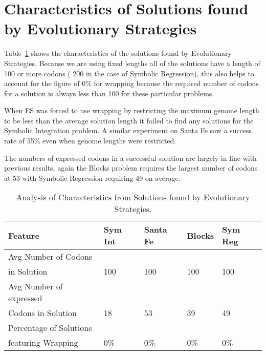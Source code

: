 \section{Characteristics of Solutions found by Evolutionary Strategies}
Table~\ref{es_results_analysis_table} shows the characteristics of the solutions found by Evolutionary Strategies. Because we are using fixed lengths all of the solutions have a length of 100 or more codons ( 200 in the case of Symbolic Regression), this also helps to account for the figure of 0\% for wrapping because the required number of codons for a solution is always less than 100 for these particular problems. 

When ES was forced to use wrapping by restricting the maximum genome length to be less than the average solution length it failed to find any solutions for the Symbolic Integration problem. A similar experiment on Santa Fe saw a success rate of 55\% even when genome lengths were restricted.

The numbers of expressed codons in a successful solution are largely in line with previous results, again the Blocks problem requires the largest number of codons at 53 with Symbolic Regression requiring 49 on average.


\begin{table}[h]
\begin{center}
\begin{tabular}{|l|l|l|l|l|}
\hline
Feature & Sym Int & Santa Fe & Blocks & Sym Reg \\
\hline
Avg Number of Codons & & & &  \\ 
in Solution & 100 & 100 & 100 & 100 \\
Avg Number of expressed & & & &  \\
Codons in Solution & 18 & 53 & 39 & 49 \\
Percentage of Solutions & & & &  \\
featuring Wrapping & 0\% & 0\% & 0\% & 0\%  \\
\hline
\end{tabular}
\caption{\label{es_results_analysis_table} Analysis of Characteristics from Solutions found by Evolutionary Strategies.}
\end{center}
\end{table}




